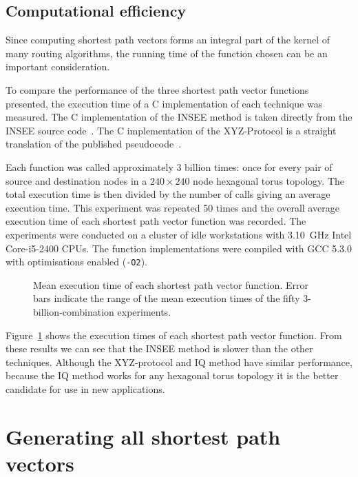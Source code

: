 		\subsection{Computational efficiency}
			
			Since computing shortest path vectors forms an integral part of the
			kernel of many routing algorithms, the running time of the function
			chosen can be an important consideration.
			
			To compare the performance of the three shortest path vector functions
			presented, the execution time of a C implementation of each technique was
			measured. The C implementation of the INSEE method is taken directly from
			the INSEE source code~\cite{navaridas09}. The C implementation of the
			XYZ-Protocol is a straight translation of the published
			pseudocode~\cite{hoffmann15}.
			
			Each function was called approximately 3 billion times: once for every
			pair of source and destination nodes in a $240\times240$ node hexagonal
			torus topology. The total execution time is then divided by the number of
			calls giving an average execution time.  This experiment was repeated 50
			times and the overall average execution time of each shortest path vector
			function was recorded. The experiments were conducted on a cluster of
			idle workstations with 3.10~GHz Intel Core-i5-2400 CPUs. The function
			implementations were compiled with GCC 5.3.0 with optimisations enabled
			(\verb|-O2|).
			
			\begin{figure}
				\center
				
				\caption[Mean execution times of shortest path vector functions.]%
				{Mean execution time of each shortest path vector function. Error bars
				indicate the range of the mean execution times of the fifty
				3-billion-combination experiments.}
				\label{fig:shortest-path-vector-runtimes}
			\end{figure}
			
			Figure~\ref{fig:shortest-path-vector-runtimes} shows the execution times
			of each shortest path vector function. From these results we can see that
			the INSEE method is slower than the other techniques. Although the
			XYZ-protocol and IQ method have similar performance, because the IQ
			method works for any hexagonal torus topology it is the better candidate
			for use in new applications.
	
	\section{Generating all shortest path vectors}
			
